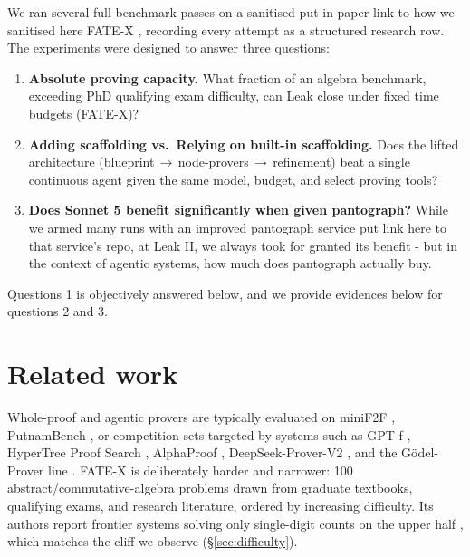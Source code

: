 \documentclass[12pt, a4paper]{article}
\begin{document}
We ran several full benchmark passes on a sanitised {put in paper link to how we sanitised here} FATE-X
\cite{fatex2025,benchmarklist_fatex}, recording every attempt as a structured
research row. The experiments were designed to answer three questions:

\begin{enumerate}[itemsep=1pt]
  \item \textbf{Absolute proving capacity.} What fraction of an algebra
        benchmark, exceeding PhD qualifying exam difficulty,
        can Leak close under fixed time budgets (FATE-X)?
  \item \textbf{Adding scaffolding vs.\ Relying on built-in scaffolding.} Does the lifted architecture
        (blueprint\,$\to$\,node-provers\,$\to$\,refinement) beat a
        single continuous agent given the same model, budget, and select proving tools?
  \item \textbf{Does Sonnet 5 benefit significantly when given pantograph?} While we armed many runs
        with an improved pantograph service {put link here to that service's repo, at Leak II}, 
        we always took for granted its benefit - but in the context of agentic systems, how much
        does pantograph actually buy.
\end{enumerate}

Questions 1 is objectively answered below, and we provide evidences below for questions 2 and 3.

\section{Related work}

Whole-proof and agentic provers are typically evaluated on miniF2F
\cite{zheng2022minif2f}, PutnamBench \cite{tsoukalas2024putnambench}, or
competition sets targeted by systems such as GPT-f \cite{polu2020gptf},
HyperTree Proof Search \cite{lample2022hypertree}, AlphaProof
\cite{alphaproof2024}, DeepSeek-Prover-V2 \cite{deepseekproverv2}, and the
G\"odel-Prover line \cite{davis2025goedelspoetry}. FATE-X \cite{fatex2025}
is deliberately harder and narrower: 100 abstract/commutative-algebra problems
drawn from graduate textbooks, qualifying exams, and research literature,
ordered by increasing difficulty. Its authors report frontier systems solving
only single-digit counts on the upper half \cite{benchmarklist_fatex}, which
matches the cliff we observe (\S\ref{sec:difficulty}). 
\end{document}
